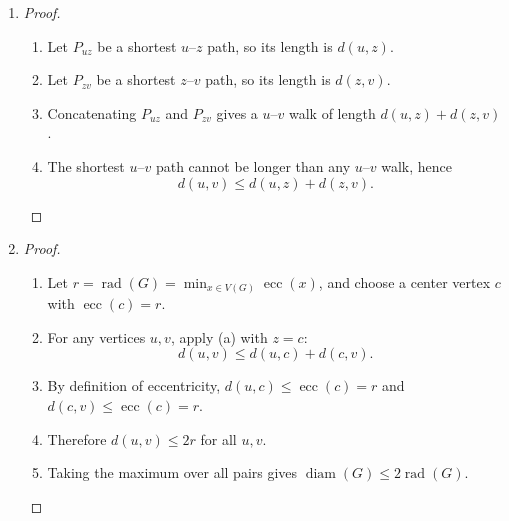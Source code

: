 \documentclass[11pt]{article}
\newcommand{\diam}{\operatorname{diam}}
\newcommand{\rad}{\operatorname{rad}}
\newcommand{\ecc}{\operatorname{ecc}}
\begin{document}
\begin{enumerate}
\item
\begin{proof}
~
\begin{enumerate}
\item Let $P_{uz}$ be a shortest $u$--$z$ path, so its length is $d(u,z)$.
\item Let $P_{zv}$ be a shortest $z$--$v$ path, so its length is $d(z,v)$.
\item Concatenating $P_{uz}$ and $P_{zv}$ gives a $u$--$v$ walk of length $d(u,z)+d(z,v)$.
\item The shortest $u$--$v$ path cannot be longer than any $u$--$v$ walk, hence
\[
d(u,v)\le d(u,z)+d(z,v).
\]
\end{enumerate}
\end{proof}

\item
\begin{proof}
~
\begin{enumerate}
\item Let $r=\rad(G)=\min_{x\in V(G)}\ecc(x)$, and choose a center vertex $c$ with $\ecc(c)=r$.
\item For any vertices $u,v$, apply (a) with $z=c$:
\[
d(u,v)\le d(u,c)+d(c,v).
\]
\item By definition of eccentricity, $d(u,c)\le \ecc(c)=r$ and $d(c,v)\le \ecc(c)=r$.
\item Therefore $d(u,v)\le 2r$ for all $u,v$.
\item Taking the maximum over all pairs gives $\diam(G)\le 2\rad(G)$.
\end{enumerate}
\end{proof}
\end{enumerate}
\end{document}

